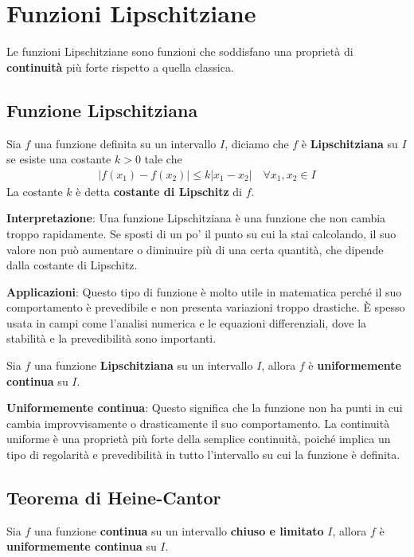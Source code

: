 \documentclass{book}
\begin{document}
\section{Funzioni Lipschitziane}
Le funzioni Lipschitziane sono funzioni che soddisfano una proprietà di \textbf{continuità} più forte rispetto a quella classica.
\begin{definition}
    \subsection{Funzione Lipschitziana}
    Sia \(f\) una funzione definita su un intervallo \(I\), diciamo che \(f\) è \textbf{Lipschitziana} su \(I\) se esiste una costante \(k > 0\) tale che
    \begin{align*}
        |f(x_1) - f(x_2)| \leq k|x_1 - x_2| \quad \forall x_1, x_2 \in I
    \end{align*}
    La costante \(k\) è detta \textbf{costante di Lipschitz} di \(f\).
\end{definition}
\textbf{Interpretazione}:
Una funzione Lipschitziana è una funzione che non cambia troppo rapidamente. Se sposti di un po' il punto su cui la stai calcolando, il suo valore non può aumentare o diminuire più di una certa quantità, che dipende dalla costante di Lipschitz.

\noindent\textbf{Applicazioni}:
Questo tipo di funzione è molto utile in matematica perché il suo comportamento è prevedibile e non presenta variazioni troppo drastiche. È spesso usata in campi come l'analisi numerica e le equazioni differenziali, dove la stabilità e la prevedibilità sono importanti.

\begin{proposition}
    Sia \(f\) una funzione \textbf{Lipschitziana} su un intervallo \(I\), allora \(f\) è \textbf{uniformemente continua} su \(I\).
\end{proposition}
\textbf{Uniformemente continua}:
Questo significa che la funzione non ha punti in cui cambia improvvisamente o drasticamente il suo comportamento. La continuità uniforme è una proprietà più forte della semplice continuità, poiché implica un tipo di regolarità e prevedibilità in tutto l'intervallo su cui la funzione è definita.

\begin{theorem}
    \subsection{Teorema di Heine-Cantor}
    Sia \(f\) una funzione \textbf{continua} su un intervallo \textbf{chiuso e limitato} \(I\), allora \(f\) è \textbf{uniformemente continua} su \(I\).
\end{theorem}
\end{document}
